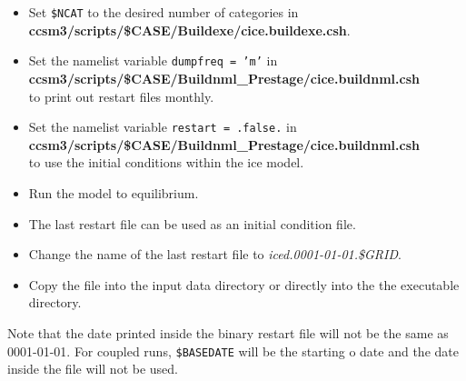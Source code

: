 \begin{itemize}
  \item Set {\tt \$NCAT} to the desired number of categories in \\
        {\bf ccsm3/scripts/\$CASE/Buildexe/cice.buildexe.csh}.
  \item Set the namelist variable {\tt dumpfreq = 'm'} in \\
        {\bf ccsm3/scripts/\$CASE/Buildnml\_Prestage/cice.buildnml.csh} \\
        to print out restart files monthly.
  \item Set the namelist variable {\tt restart = .false.} in 
        {\bf ccsm3/scripts/\$CASE/Buildnml\_Prestage/cice.buildnml.csh} \\
        to use the initial conditions within the ice model.
  \item Run the model to equilibrium. 
  \item The last restart file can be used as an initial condition file.
  \item Change the name of the last restart file to {\it iced.0001-01-01.\$GRID}.
  \item Copy the file into the input data directory or directly into the 
        the executable directory.
\end{itemize}

Note that the date printed inside the binary restart file will not be the 
same as 0001-01-01.  For coupled runs, {\tt \$BASEDATE} will be the starting o
date and the date inside the file will not be used.  

